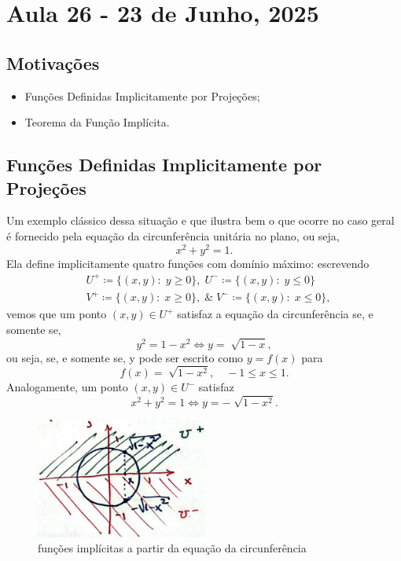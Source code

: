 \documentclass[../analysisII_notes.tex]{subfiles}
\begin{document}
\section{Aula 26 - 23 de Junho, 2025}
\subsection{Motivações}
\begin{itemize}
	\item Funções Definidas Implicitamente por Projeções;
	\item Teorema da Função Implícita.
\end{itemize}
\subsection{Funções Definidas Implicitamente por Projeções}
Um exemplo clássico dessa situação e que ilustra bem o que ocorre no caso geral é fornecido pela equação da circunferência unitária no plano, ou seja,
\[
	x^{2} + y^{2} = 1.
\]
Ela define implicitamente quatro funções com domínio máximo: escrevendo
\begin{align*}
	 & U^{+}\coloneqq \{(x, y):\;y\geq 0\},\; U^{-}\coloneqq \{(x, y):\;y \leq 0\}          \\
	 & V^{+}\coloneqq \{(x, y):\;x \geq 0\}, \;\&\; V^{-} \coloneqq \{(x, y):\; x \leq 0\},
\end{align*}
vemos que um ponto \((x, y)\in U^{+}\) satisfaz a equação da circunferência se, e somente se,
\[
	y^{2} = 1-x^{2} \Longleftrightarrow y = \sqrt[]{1-x},
\]
ou seja, se, e somente se, y pode ser escrito como \(y = f(x)\) para
\[
	f(x) = \sqrt[]{1-x^{2}},\quad -1\leq x\leq 1.
\]
Analogamente, um ponto \((x, y)\in U^{-}\) satisfaz
\[
	x^{2} + y^{2} = 1 \Longleftrightarrow y = -\sqrt[]{1-x^{2}}.
\]
\begin{figure}[H]
	\begin{center}
		\includegraphics[height=0.5\textheight, width=0.5\textwidth, keepaspectratio]{./Images/circ_implicit_26.png}
	\end{center}
	\caption{funções implícitas a partir da equação da circunferência}
\end{figure}
\end{document}
